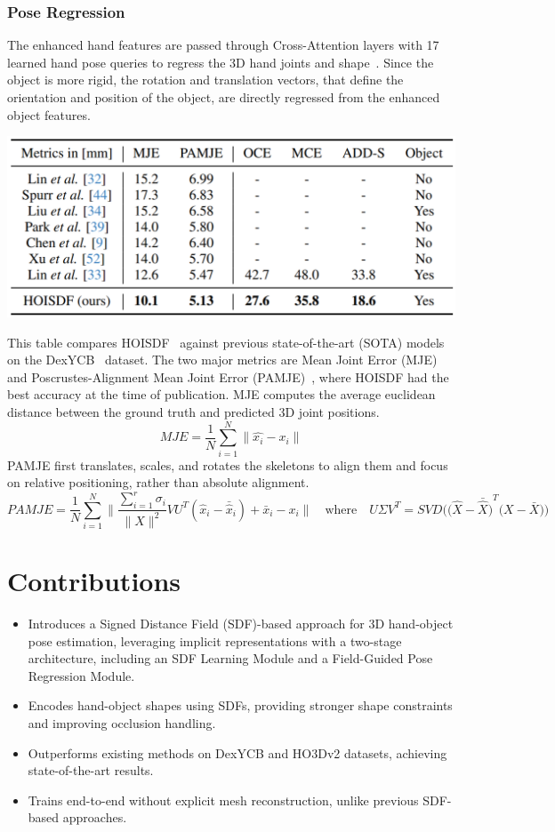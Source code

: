 \documentclass{article}
\begin{document}
\subsubsection*{Pose Regression}

The enhanced hand features are passed through Cross-Attention layers with 17 learned hand pose queries to regress the 3D hand joints and shape~\cite{hampali2022keypointtransformer}. Since the object is more rigid, the rotation and translation vectors, that define the orientation and position of the object, are directly regressed from the enhanced object features.

\begin{center}
    \includegraphics[scale=0.3]{hoisdf-4.png}
\end{center}

This table compares HOISDF~\cite{qi2024hoisdf} against previous state-of-the-art (SOTA) models on the DexYCB~\cite{chao2021dexycb} dataset. The two major metrics are Mean Joint Error (MJE) and Poscrustes-Alignment Mean Joint Error (PAMJE)~\cite{zimmermann2017handpose}, where HOISDF had the best accuracy at the time of publication. MJE computes the average euclidean distance between the ground truth and predicted 3D joint positions.
\[MJE=\frac{1}{N}\sum_{i=1}^N\|\hat{x_i}-x_i\|\]
PAMJE first translates, scales, and rotates the skeletons to align them and focus on relative positioning, rather than absolute alignment.
\[PAMJE=\frac{1}{N}\sum_{i=1}^N\Bigg\|\frac{\sum_{i=1}^r\sigma_i}{\|X\|^2} VU^T(\hat{x}_i-\bar{\hat{x}}_i)+\bar{x}_i-x_i\Bigg\|\quad\text{where}\quad U\Sigma V^T=SVD\Big({\big(\hat{X}-\bar{\hat{X}}\big)}^T\big(X-\bar{X}\big)\Big)\]

\section*{Contributions}
\begin{itemize}
    \item Introduces a Signed Distance Field (SDF)-based approach for 3D hand-object pose estimation, leveraging implicit representations with a two-stage architecture, including an SDF Learning Module and a Field-Guided Pose Regression Module.
    \item Encodes hand-object shapes using SDFs, providing stronger shape constraints and improving occlusion handling.
    \item Outperforms existing methods on DexYCB and HO3Dv2 datasets, achieving state-of-the-art results.
    \item Trains end-to-end without explicit mesh reconstruction, unlike previous SDF-based approaches.
\end{itemize}
\end{document}
